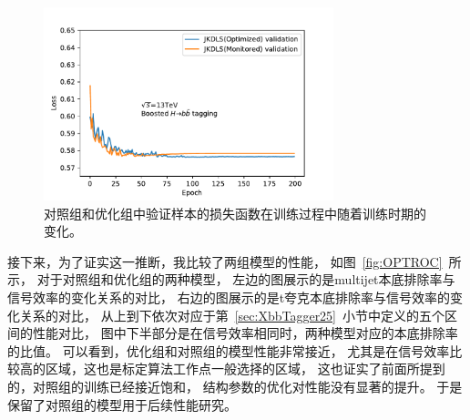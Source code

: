 \begin{figure}
  \begin{center}
    \includegraphics[width=0.75\textwidth]{figuresXbb/LossCOM.pdf}
  \end{center}
  \caption{
对照组和优化组中验证样本的损失函数在训练过程中随着训练时期的变化。
  }
    \label{fig:LOSSC}
\end{figure}

接下来，为了证实这一推断，我比较了两组模型的性能，
如图~\ref{fig:OPTROC}~所示，
对于对照组和优化组的两种模型，
左边的图展示的是multijet本底排除率与信号效率的变化关系的对比，
右边的图展示的是t夸克本底排除率与信号效率的变化关系的对比，
从上到下依次对应于第~\ref{sec:XbbTagger25}~小节中定义的五个区间的性能对比，
图中下半部分是在信号效率相同时，两种模型对应的本底排除率的比值。
可以看到，优化组和对照组的模型性能非常接近，
尤其是在信号效率比较高的区域，这也是标定算法工作点一般选择的区域，
这也证实了前面所提到的，对照组的训练已经接近饱和，
结构参数的优化对性能没有显著的提升。
于是保留了对照组的模型用于后续性能研究。

